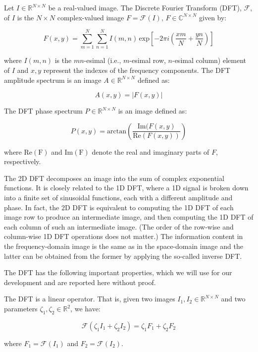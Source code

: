 \begin{definition}
    \label{def:dft}
    Let $I\in \mathbb{R}^{N\times N}$ be a real-valued image. The Discrete Fourier Transform (DFT), $\mathcal{F}$, of $I$ is the $N\times N$ complex-valued image $F=\mathcal{F}(I),\, F \in \mathbb{C}^{N\times N}$ given by:

\begin{equation}
\label{eq:F_xy}
    F(x,y) = \sum_{m=1}^{N} \sum_{n=1}^{N}I(m,n) \, \mathrm{exp}\left[ -2\pi i \left( \frac{xm}{N} + \frac{yn}{N}\right) \right]
\end{equation}

where $I(m,n)$ is the $mn$-esimal (i.e., $m$-esimal row, $n$-esimal column) element of $I$ and $x,y$ represent the indexes of the frequency components. The DFT amplitude spectrum is an image $A \in \mathbb{R}^{N\times N}$ defined as:

\begin{equation}
    A(x,y) = |F(x,y)|
\end{equation}

The DFT phase spectrum $P \in \mathbb{R}^{N\times N}$ is an image defined as:

\begin{equation}
P(x,y) = \mathrm{arctan}\left( \dfrac{\mathrm{Im}(F(x,y)}{\mathrm{Re}(F(x,y))} \right) 
\end{equation}

where $\mathrm{Re(F)}$ and $\mathrm{Im(F)}$ denote the real and imaginary parts of $F$, respectively.
\end{definition}

The 2D DFT decomposes an image into the sum of complex exponential functions. It is closely related to the 1D DFT, where a 1D signal is broken down into a finite set of sinusoidal functions, each with a different amplitude and phase. In fact, the 2D DFT is equivalent to computing the 1D DFT of each image row to produce an intermediate image, and then computing the 1D DFT of each column of such an intermediate image. (The order of the row-wise and column-wise 1D DFT operations does not matter.) The information content in the frequency-domain image is the same as in the space-domain image and the latter can be obtained from the former by applying the so-called inverse DFT.

The DFT has the following important properties, which we will use for our development and are reported here without proof.

\begin{lemma}
\label{lemma:dft_linearity}
The DFT is a linear operator. That is, given two images $I_1,I_2\in\mathbb{R}^{N\times N}$ and two parameters $\zeta_1,\zeta_2\in\mathbb{R}^2$, we have:

\begin{equation}
    \mathcal{F}(\zeta_1 I_1 + \zeta_2 I_2) = \zeta_1 F_1 + \zeta_2 F_2
\end{equation}

where $F_1 = \mathcal{F}(I_1)$ and $F_2 = \mathcal{F}(I_2)$.
\end{lemma}

